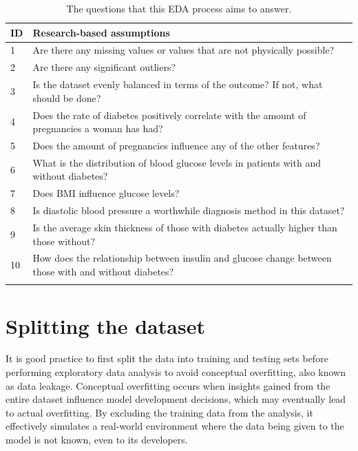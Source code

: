 \documentclass[12pt]{report}
\begin{document}
\begin{longtable}{ | p{} | p{} | }
    \hline
    \cellcolor{blue!25} ID & \cellcolor{blue!25} Research-based assumptions \\
    \hline
    1 & Are there any missing values or values that are not physically possible?\\
    \hline
    2 & Are there any significant outliers?\\
    \hline 
    3 & Is the dataset evenly balanced in terms of the outcome? If not, what should be done?\\
    \hline 
    4 & Does the rate of diabetes positively correlate with the amount of pregnancies a woman has had?\\
    \hline
    5 & Does the amount of pregnancies influence any of the other features?\\
    \hline
    6 & What is the distribution of blood glucose levels in patients with and without diabetes?\\
    \hline
    7 & Does BMI influence glucose levels?\\
    \hline
    8 & Is diastolic blood pressure a worthwhile diagnosis method in this dataset?\\
    \hline
    9 & Is the average skin thickness of those with diabetes actually higher than those without?\\
    \hline
    10 & How does the relationship between insulin and glucose change between those with and without diabetes?\\
    \hline
    \caption{The questions that this EDA process aims to answer.}\label{tab:Questions}
\end{longtable}

\section{Splitting the dataset}
It is good practice to first split the data into training and testing sets before performing exploratory data analysis
to avoid conceptual overfitting, also known as data leakage. Conceptual overfitting occurs when insights gained from the entire dataset 
influence model development decisions, which may eventually lead to actual overfitting. By excluding the training data from the analysis,
it effectively simulates a real-world environment where the data being given to the model is not known, even to its developers.
\end{document}
